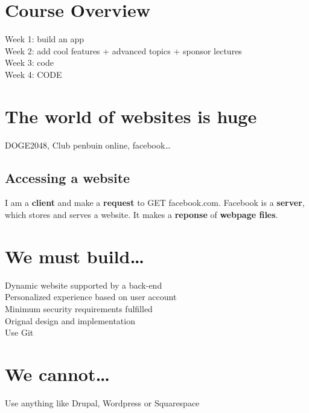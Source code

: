 \documentclass{assignment}
\date{\today}
\begin{document}
    \section{Course Overview}
    Week 1: build an app\\Week 2: add cool features + advanced topics + sponsor lectures\\Week 3: code\\Week 4: CODE
    \section{The world of websites is huge}
    DOGE2048, Club penbuin online, facebook\dots
    \subsection{Accessing a website}
    I am a \textbf{client} and make a \textbf{request} to GET facebook.com. Facebook is a \textbf{server}, which stores and serves a website. It makes a \textbf{reponse} of \textbf{webpage files}. 
    \section{We must build\dots}
    Dynamic website supported by a back-end \\ Personalized experience based on user account \\ Minimum security requirements fulfilled \\ Orignal design and implementation \\ Use Git
    \section{We cannot\dots}
    Use anything like Drupal, Wordpress or Squarespace
\end{document}
